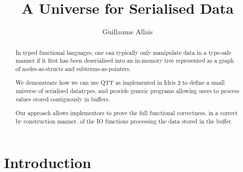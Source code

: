 \documentclass{article}
\title{A Universe for Serialised Data}
\author{Guillaume Allais}
\newcommand{\idris}{Idris 2}
\begin{document}
\maketitle

\begin{abstract}
In typed functional languages, one can typically only manipulate data
in a type-safe manner if it first has been deserialised into an in-memory
tree represented as a graph of nodes-as-structs and subterms-as-pointers.

We demonstrate how we can use QTT as implemented in \idris{} to define
a small universe of serialised datatypes, and provide generic programs
allowing users to process values stored contiguously in buffers.

Our approach allows implementors to prove the full functional correctness,
in a correct by construction manner, of the IO functions processing the
data stored in the buffer.
\end{abstract}

\section{Introduction}




\end{document}
